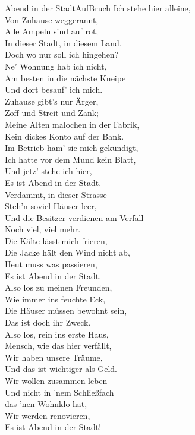 
\begin{lied}{Abend in der Stadt}{AufBruch}
Ich stehe hier alleine,\\
Von Zuhause weggerannt,\\
Alle Ampeln sind auf rot,\\
In dieser Stadt, in diesem Land.\\

Doch wo nur soll ich hingehen?\\
Ne' Wohnung hab ich nicht,\\
Am besten in die nächste Kneipe\\
Und dort besauf' ich mich.\\

Zuhause gibt's nur Ärger,\\
Zoff und Streit und Zank;\\
Meine Alten malochen in der Fabrik,\\
Kein dickes Konto auf der Bank.\\

Im Betrieb ham' sie mich gekündigt,\\
Ich hatte vor dem Mund kein Blatt,\\
Und jetz' stehe ich hier,\\
Es ist Abend in der Stadt.\\

Verdammt, in dieser Strasse\\
Steh'n soviel Häuser leer,\\
Und die Besitzer verdienen am Verfall\\
Noch viel, viel mehr.\\
Die Kälte lässt mich frieren,\\
Die Jacke hält den Wind nicht ab,\\
Heut muss was passieren,\\
Es ist Abend in der Stadt.\\

Also los zu meinen Freunden,\\
Wie immer ins feuchte Eck,\\
Die Häuser müssen bewohnt sein,\\
Das ist doch ihr Zweck.\\

Also los, rein ins erste Haus,\\
Mensch, wie das hier verfällt,\\
Wir haben unsere Träume,\\
Und das ist wichtiger als Geld.\\
Wir wollen zusammen leben\\
Und nicht in 'nem Schließfach\\
das 'nen Wohnklo hat,\\
Wir werden renovieren,\\
Es ist Abend in der Stadt!\\


\end{lied}
